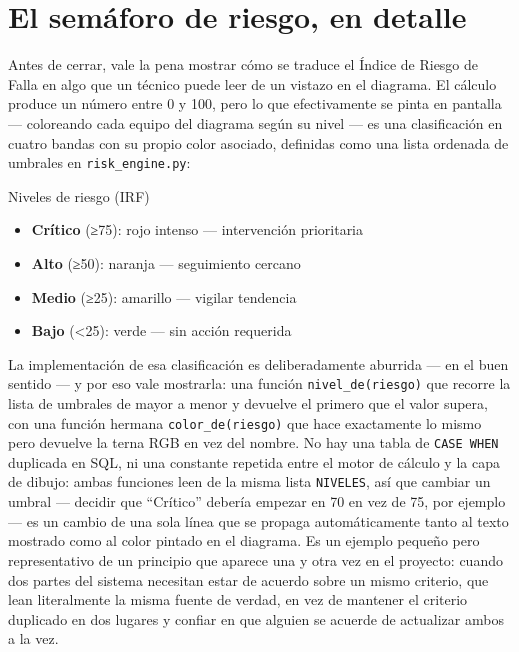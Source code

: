 \documentclass[11pt,twocolumn]{article}
\begin{document}
\section{El semáforo de riesgo, en detalle}

Antes de cerrar, vale la pena mostrar cómo se traduce el Índice de Riesgo de Falla en algo que un técnico puede leer de un vistazo en el diagrama. El cálculo produce un número entre 0 y 100, pero lo que efectivamente se pinta en pantalla --- coloreando cada equipo del diagrama según su nivel --- es una clasificación en cuatro bandas con su propio color asociado, definidas como una lista ordenada de umbrales en \texttt{risk\_engine.py}:

\begin{specbox}{Niveles de riesgo (IRF)}
\begin{itemize}[leftmargin=1.1em,itemsep=2pt,topsep=2pt]
\item \textbf{Crítico} (≥75): rojo intenso --- intervención prioritaria
\item \textbf{Alto} (≥50): naranja --- seguimiento cercano
\item \textbf{Medio} (≥25): amarillo --- vigilar tendencia
\item \textbf{Bajo} (\textless25): verde --- sin acción requerida
\end{itemize}
\end{specbox}

La implementación de esa clasificación es deliberadamente aburrida --- en el buen sentido --- y por eso vale mostrarla: una función \texttt{nivel\_de(riesgo)} que recorre la lista de umbrales de mayor a menor y devuelve el primero que el valor supera, con una función hermana \texttt{color\_de(riesgo)} que hace exactamente lo mismo pero devuelve la terna RGB en vez del nombre. No hay una tabla de \texttt{CASE WHEN} duplicada en SQL, ni una constante repetida entre el motor de cálculo y la capa de dibujo: ambas funciones leen de la misma lista \texttt{NIVELES}, así que cambiar un umbral --- decidir que ``Crítico'' debería empezar en 70 en vez de 75, por ejemplo --- es un cambio de una sola línea que se propaga automáticamente tanto al texto mostrado como al color pintado en el diagrama. Es un ejemplo pequeño pero representativo de un principio que aparece una y otra vez en el proyecto: cuando dos partes del sistema necesitan estar de acuerdo sobre un mismo criterio, que lean literalmente la misma fuente de verdad, en vez de mantener el criterio duplicado en dos lugares y confiar en que alguien se acuerde de actualizar ambos a la vez.
\end{document}

